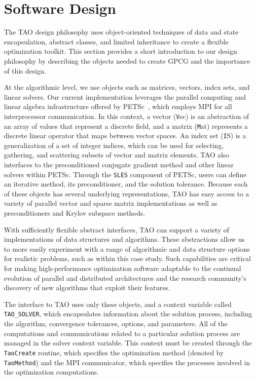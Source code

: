 \section{Software Design} \label{design}

The TAO design philosophy uses object-oriented techniques of data and
state encapsulation, abstract classes, and limited inheritance to
create a flexible optimization toolkit.  This section provides a short
introduction to our design philosophy by describing the objects needed
to create GPCG and the importance of this design.   

At the algorithmic level, we use objects such as matrices, vectors, 
index sets, and linear solvers.  
Our current implementation leverages the parallel computing
and linear algebra infrastructure offered by 
PETSc~\cite{petsc,PETSc-user-ref},
which employs MPI \cite{using-mpi} for all interprocessor communication.
In this context, a vector ({\texttt Vec}) is an abstraction of an
array of values that represent a discrete field, and a matrix
({\texttt Mat}) represents a discrete linear operator that maps
between vector spaces.  An index set ({\texttt IS}) is a
generalization of a set of integer indices, which can be used for
selecting, gathering, and scattering subsets of vector and matrix
elements.  TAO also interfaces to the preconditioned conjugate gradient 
method and other linear solvers within
PETSc.  Through the \texttt{SLES} component of PETSc, users can define an iterative method,
its preconditioner, and the solution tolerance.
Because each of these objects has several underlying 
representations, TAO has easy access to a variety of parallel vector
and sparse matrix implementations as well as preconditioners and
Krylov subspace methods.

With sufficiently flexible 
abstract interfaces, TAO can support a variety of implementations of 
data structures and algorithms.  These abstractions allow us
to more easily experiment with a range of algorithmic and data
structure options for realistic problems, such as within this case
study.  Such capabilities are critical for making high-performance
optimization software adaptable to the continual evolution of parallel
and distributed architectures and the research community's discovery
of new algorithms that exploit their features.

The interface to TAO uses only these objects, and a
context variable called \texttt{TAO\_SOLVER}, which encapsulates
information about the solution process, including the algorithm,
convergence tolerances, options, and parameters.  All of the
computations and communications related to a particular solution
process are managed in the solver context variable.  This context
must be created through the  \texttt{TaoCreate} routine, which
specifies the optimization method (denoted by
\texttt{TaoMethod}) and the MPI communicator, which specifies the
processes involved in the optimization computations.

